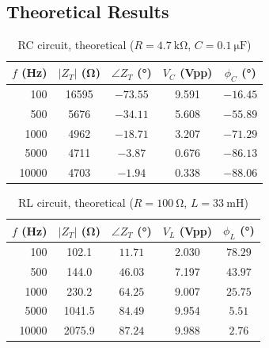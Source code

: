 \documentclass[11pt]{article}
\begin{document}
\subsection*{Theoretical Results}

\begin{table}[H]
    \centering
    \caption{RC circuit, theoretical ($R = \SI{4.7}{\kilo\ohm}$, $C = \SI{0.1}{\micro\farad}$)}
    \begin{tabular}{rcccc}
        \toprule
        $f$ (Hz) & $|Z_T|$ (\si{\ohm}) & $\angle Z_T$ (\si{\degree})
                 & $V_C$ (Vpp) & $\phi_C$ (\si{\degree}) \\
        \midrule
        100    & 16595 & $-73.55$ & 9.591 & $-16.45$ \\
        500    &  5676 & $-34.11$ & 5.608 & $-55.89$ \\
        1000   &  4962 & $-18.71$ & 3.207 & $-71.29$ \\
        5000   &  4711 & $-3.87$  & 0.676 & $-86.13$ \\
        10000  &  4703 & $-1.94$  & 0.338 & $-88.06$ \\
        \bottomrule
    \end{tabular}
\end{table}

\begin{table}[H]
    \centering
    \caption{RL circuit, theoretical ($R = \SI{100}{\ohm}$, $L = \SI{33}{\milli\henry}$)}
    \begin{tabular}{rcccc}
        \toprule
        $f$ (Hz) & $|Z_T|$ (\si{\ohm}) & $\angle Z_T$ (\si{\degree})
                 & $V_L$ (Vpp) & $\phi_L$ (\si{\degree}) \\
        \midrule
        100    &  102.1 & $11.71$ & 2.030 & $78.29$ \\
        500    &  144.0 & $46.03$ & 7.197 & $43.97$ \\
        1000   &  230.2 & $64.25$ & 9.007 & $25.75$ \\
        5000   & 1041.5 & $84.49$ & 9.954 & $5.51$  \\
        10000  & 2075.9 & $87.24$ & 9.988 & $2.76$  \\
        \bottomrule
    \end{tabular}
\end{table}
\end{document}
